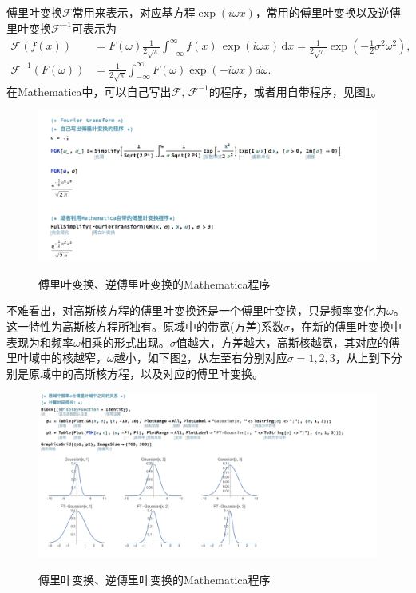 \begin{subappendices}
傅里叶变换$\mathcal{F}$常用来表示，对应基方程$\exp \left( i \omega x \right)$，常用的傅里叶变换以及逆傅里叶变换$\mathcal{F}^{-1}$可表示为
\begin{align}
  \label{eq:gaussian-kernel-fourier-trans}
  \mathcal{F} \left( f(x) \right) & = F \left( \omega \right)
  \frac{1}{2 \sqrt{\pi}} \int_{-\infty}^{\infty} f(x) \, \exp \left( i \omega x \right) \, \mathrm{d} x = \frac{1}{2 \sqrt{\pi}} \exp \left( - \frac{1}{2} \sigma^{2} \omega^{2} \right), \\
  \mathcal{F}^{-1} \left( F \left( \omega \right) \right)
  & = \frac{1}{2 \sqrt{\pi}} \int_{-\infty}^{\infty} F \left( \omega \right) \exp \left( - i \omega x \right) d \omega.
\end{align}
在Mathematica中，可以自己写出$\mathcal{F}, \, \mathcal{F}^{-1}$的程序，或者用自带程序，见图\ref{fig:fourier-transform-mma.png}。
\begin{figure}[htbp]
  \caption{傅里叶变换、逆傅里叶变换的Mathematica程序}
  \centering
  \includegraphics[width=12cm]{./Figures/20180405-fourier-transform-mma}
  \label{fig:fourier-transform-mma.png}
%
\end{figure}

不难看出，对高斯核方程的傅里叶变换还是一个傅里叶变换，只是频率变化为$\omega$。这一特性为高斯核方程所独有。原域中的带宽(方差)系数$\sigma$，在新的傅里叶变换中表现为和频率$\omega$相乘的形式出现。$\sigma$值越大，方差越大，高斯核越宽，其对应的傅里叶域中的核越窄，$\omega$越小，如下图\ref{fig:fourier-transform-kernel-compare.png}，从左至右分别对应$\sigma = 1,2,3$，从上到下分别是原域中的高斯核方程，以及对应的傅里叶变换。

\begin{figure}[htbp]
  \caption{傅里叶变换、逆傅里叶变换的Mathematica程序}
  \centering
  \includegraphics[width=15cm]{./Figures/20180405-kernel-compare.png}
  \label{fig:fourier-transform-kernel-compare.png}
%
\end{figure}


\end{subappendices}
